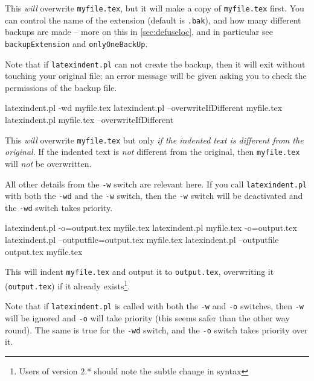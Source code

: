  This \emph{will} overwrite \texttt{myfile.tex}, but it will make a copy of
 \texttt{myfile.tex} first. You can control the name of the extension (default is
 \texttt{.bak}), and how many different backups are made -- more on this in
 \cref{sec:defuseloc}, and in particular see \texttt{backupExtension} and
 \texttt{onlyOneBackUp}.

 Note that if \texttt{latexindent.pl} can not create the backup, then it will exit
 without touching your original file; an error message will be given asking you to check
 the permissions of the backup file.


 \begin{commandshell}
latexindent.pl -wd myfile.tex
latexindent.pl --overwriteIfDifferent myfile.tex
latexindent.pl myfile.tex --overwriteIfDifferent
\end{commandshell}

 This \emph{will} overwrite \texttt{myfile.tex} but only \emph{if the indented text is
 different from the original}. If the indented text is \emph{not} different from the
 original, then \texttt{myfile.tex} will \emph{not} be overwritten.

 All other details from the \texttt{-w} switch are relevant here. If you call
 \texttt{latexindent.pl} with both the \texttt{-wd} and the \texttt{-w} switch, then the
 \texttt{-w} switch will be deactivated and the \texttt{-wd} switch takes priority.


 \begin{commandshell} 
latexindent.pl -o=output.tex myfile.tex
latexindent.pl myfile.tex -o=output.tex 
latexindent.pl --outputfile=output.tex myfile.tex
latexindent.pl --outputfile output.tex myfile.tex
\end{commandshell}

 This will indent \texttt{myfile.tex} and output it to \texttt{output.tex}, overwriting
 it (\texttt{output.tex}) if it already exists\footnote{Users of version 2.* should note
 the subtle change in syntax}.

 Note that if \texttt{latexindent.pl} is called with both the \texttt{-w} and \texttt{-o}
 switches, then \texttt{-w} will be ignored and \texttt{-o} will take priority (this
 seems safer than the other way round). The same is true for the \texttt{-wd} switch, and
 the \texttt{-o} switch takes priority over it.

